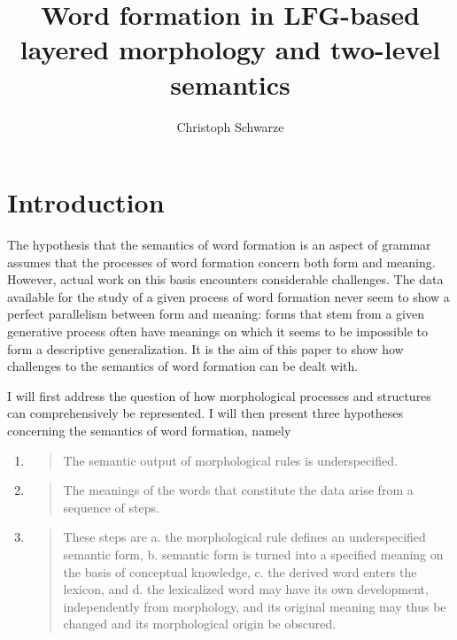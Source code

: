 \documentclass[output=paper]{langsci/langscibook}
\title{Word formation in LFG-based layered morphology and two-level semantics}
\author{Christoph Schwarze}
\begin{document}


\section{Introduction}

The hypothesis that the semantics of word formation is an aspect of grammar assumes that the processes of word formation concern both form and meaning. However, actual work on this basis encounters considerable challenges. The data available for the study of a given process of word formation never seem to show a perfect parallelism between form and meaning: forms that stem from a given generative process often have meanings on which it seems to be impossible to form a descriptive generalization. It is the aim of this paper to show how challenges to the semantics of word formation can be dealt with.

I will first address the question of how morphological processes and structures can comprehensively be represented. I will then present three hypotheses concerning the semantics of word formation, namely

\begin{enumerate}
\def\labelenumi{\roman{enumi}.}
\item \begin{quote}

 The semantic output of morphological rules is underspecified. \end{quote}
\item \begin{quote}

 The meanings of the words that constitute the data arise from a sequence of steps. \end{quote}
\item \begin{quote}

 These steps are a. the morphological rule defines an underspecified semantic form, b. semantic form is turned into a specified meaning on the basis of conceptual knowledge, c. the derived word enters the lexicon, and d. the lexicalized word may have its own development, independently from morphology, and its original meaning may thus be changed and its morphological origin be obscured. \end{quote}
\end{enumerate}
\end{document}

